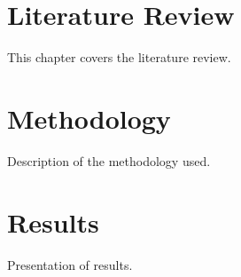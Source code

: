 \documentclass{article}
\begin{document}
    \chapter{Literature Review}
    \label{chap:literature}
    This chapter covers the literature review.



    \chapter{Methodology}
    \label{chap:methodology}
    Description of the methodology used.


    \chapter{Results}
    \label{chap:results}
    Presentation of results.

    
\end{document}
